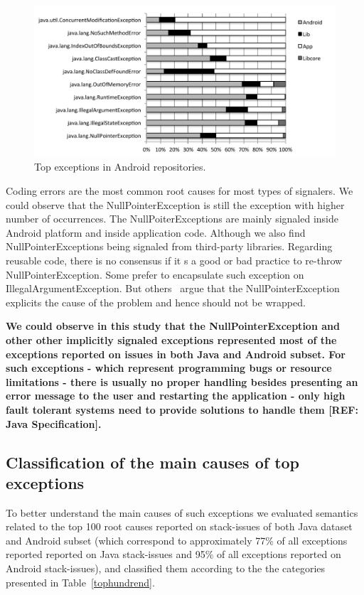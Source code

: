 \documentclass[conference]{IEEEtran}
\begin{document}
\begin{figure}
\centering
\includegraphics[width=\hsize]{top_exceptios_android.pdf}
\caption{Top exceptions in Android repositories.}
\label{fig:androidsignaler}
\end{figure}

Coding errors are the most common root causes for most types of signalers. We could observe that the NullPointerException is still the exception with higher number of occurrences. The NullPoiterExceptions are mainly signaled inside Android platform and inside application code. Although we also find NullPointerExceptions being signaled from third-party libraries. Regarding reusable code, there is no consensus if it s a good or bad practice to re-throw NullPointerException. Some prefer to encapsulate such exception on IllegalArgumentException. But others~\cite{joshuabloch} argue that the NullPointerException  explicits the cause of the problem and hence should not be wrapped. 

\textbf{We could observe in this study that the NullPointerException and other other implicitly signaled exceptions represented most of the exceptions reported on issues in both Java and Android subset. For such exceptions - which represent programming bugs or resource limitations - there is usually no proper handling besides presenting an error message to the user and restarting the application - only high fault tolerant systems need to provide solutions to handle them [REF: Java Specification].}

\subsection{Classification of the main causes of top exceptions}

To better understand the main causes of such exceptions we evaluated semantics related to the top 100 root causes reported on stack-issues of both Java dataset and Android subset (which correspond to approximately 77\% of all exceptions reported reported on Java stack-issues and 95\% of all exceptions reported on Android stack-issues), and classified them according to the the categories presented in Table~\ref{tophundrend}.
\end{document}
